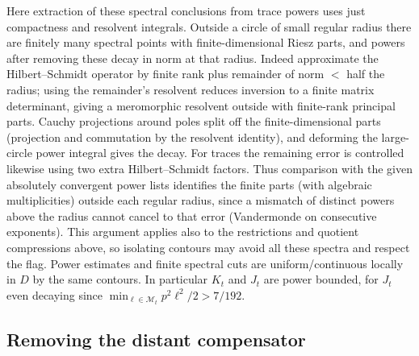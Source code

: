 Here extraction of these spectral conclusions from trace powers uses just compactness and resolvent integrals. Outside a circle of small regular radius there are finitely many spectral points with finite-dimensional Riesz parts, and powers after removing these decay in norm at that radius. Indeed approximate the Hilbert--Schmidt operator by finite rank plus remainder of norm \(<\) half the radius; using the remainder's resolvent reduces inversion to a finite matrix determinant, giving a meromorphic resolvent outside with finite-rank principal parts. Cauchy projections around poles split off the finite-dimensional parts (projection and commutation by the resolvent identity), and deforming the large-circle power integral gives the decay. For traces the remaining error is controlled likewise using two extra Hilbert--Schmidt factors. Thus comparison with the given absolutely convergent power lists identifies the finite parts (with algebraic multiplicities) outside each regular radius, since a mismatch of distinct powers above the radius cannot cancel to that error (Vandermonde on consecutive exponents). This argument applies also to the restrictions and quotient compressions above, so isolating contours may avoid all these spectra and respect the flag. Power estimates and finite spectral cuts are uniform/continuous locally in \(D\) by the same contours. In particular \(K_t\) and \(J_t\) are power bounded, for \(J_t\) even decaying since \(\min_{\ell\in\mathcal M_t}p^2\ell^2/2>7/192\).

\subsection{Removing the distant compensator}

